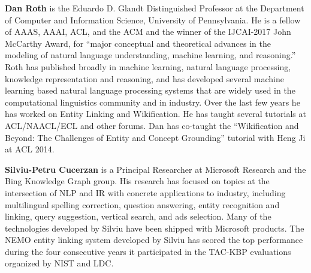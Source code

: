 {\bfseries Dan Roth} is the Eduardo D. Glandt Distinguished
Professor at the Department of Computer
and Information Science, University
of Pennsylvania. He is a fellow of AAAS,
AAAI, ACL, and the ACM and the winner of
the IJCAI-2017 John McCarthy Award, for
“major conceptual and theoretical advances
in the modeling of natural language understanding,
machine learning, and reasoning.”
Roth has published broadly in machine learning,
natural language processing, knowledge
representation and reasoning, and has developed
several machine learning based natural
language processing systems that are widely
used in the computational linguistics community
and in industry. Over the last few
years he has worked on Entity Linking and
Wikification. He has taught several tutorials
at ACL/NAACL/ECL and other forums.
Dan has co-taught the “Wikification and Beyond:
The Challenges of Entity and Concept
Grounding” tutorial with Heng Ji at ACL
2014.

{\bfseries Silviu-Petru Cucerzan} is a Principal Researcher
at Microsoft Research and the Bing Knowledge
Graph group. His research has focused
on topics at the intersection of NLP
and IR with concrete applications to industry,
including multilingual spelling correction,
question answering, entity recognition and
linking, query suggestion, vertical search,
and ads selection. Many of the technologies
developed by Silviu have been shipped with
Microsoft products. The NEMO entity linking
system developed by Silviu has scored
the top performance during the four consecutive
years it participated in the TAC-KBP
evaluations organized by NIST and LDC.



